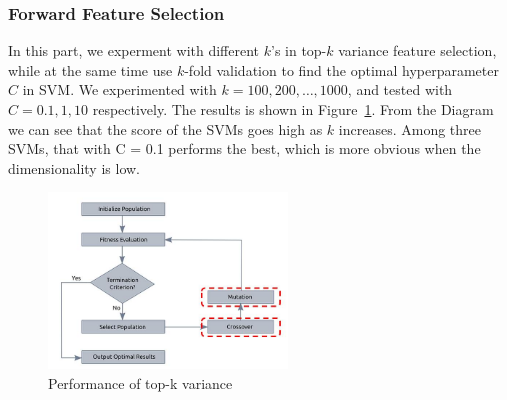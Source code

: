 \documentclass[journal]{IEEEtran}
\begin{document}
\subsubsection{Forward Feature Selection}
In this part, we experment with different $k$'s in top-$k$ variance feature selection, while at the same time use $k$-fold validation to find the optimal hyperparameter $C$ in SVM. We experimented with $k=100, 200, \ldots, 1000$, and tested with $C = 0.1, 1, 10$ respectively. The results is shown in Figure~\ref{fig:2}. From the Diagram we can see that the score of the SVMs goes high as $k$ increases. Among three SVMs, that with C = 0.1 performs the best, which is more obvious when the dimensionality is low.
\begin{figure}[htpb]
  \centering
  \includegraphics[width=2.5in]{genetic_alg.jpg}
  \caption{Performance of top-k variance}
  \label{fig:2}
  \vspace{-3mm}
\end{figure}
\end{document}
